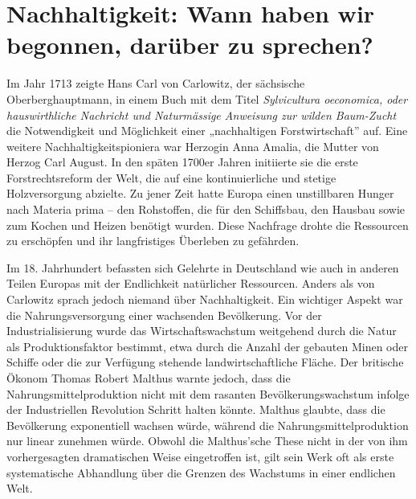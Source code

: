 \documentclass[
  nswissgerman,
  a4paper,
  openany]{book}
\begin{document}
\section{Nachhaltigkeit: Wann haben wir begonnen, darüber zu
sprechen?}\label{nachhaltigkeit-wann-haben-wir-begonnen-daruxfcber-zu-sprechen}

Im Jahr 1713 zeigte Hans Carl von Carlowitz, der sächsische
Oberberghauptmann, in einem Buch mit dem Titel \emph{Sylvicultura
oeconomica, oder hauswirthliche Nachricht und Naturmässige Anweisung zur
wilden Baum-Zucht} die Notwendigkeit und Möglichkeit einer „nachhaltigen
Forstwirtschaft'' auf. Eine weitere Nachhaltigkeitspioniera war Herzogin
Anna Amalia, die Mutter von Herzog Carl August. In den späten 1700er
Jahren initiierte sie die erste Forstrechtsreform der Welt, die auf eine
kontinuierliche und stetige Holzversorgung abzielte. Zu jener Zeit hatte
Europa einen unstillbaren Hunger nach Materia prima -- den Rohstoffen,
die für den Schiffsbau, den Hausbau sowie zum Kochen und Heizen benötigt
wurden. Diese Nachfrage drohte die Ressourcen zu erschöpfen und ihr
langfristiges Überleben zu gefährden.

Im 18. Jahrhundert befassten sich Gelehrte in Deutschland wie auch in
anderen Teilen Europas mit der Endlichkeit natürlicher Ressourcen.
Anders als von Carlowitz sprach jedoch niemand über Nachhaltigkeit. Ein
wichtiger Aspekt war die Nahrungsversorgung einer wachsenden
Bevölkerung. Vor der Industrialisierung wurde das Wirtschaftswachstum
weitgehend durch die Natur als Produktionsfaktor bestimmt, etwa durch
die Anzahl der gebauten Minen oder Schiffe oder die zur Verfügung
stehende landwirtschaftliche Fläche. Der britische Ökonom Thomas Robert
Malthus warnte jedoch, dass die Nahrungsmittelproduktion nicht mit dem
rasanten Bevölkerungswachstum infolge der Industriellen Revolution
Schritt halten könnte. Malthus glaubte, dass die Bevölkerung
exponentiell wachsen würde, während die Nahrungsmittelproduktion nur
linear zunehmen würde. Obwohl die Malthus'sche These nicht in der von
ihm vorhergesagten dramatischen Weise eingetroffen ist, gilt sein Werk
oft als erste systematische Abhandlung über die Grenzen des Wachstums in
einer endlichen Welt.
\end{document}
